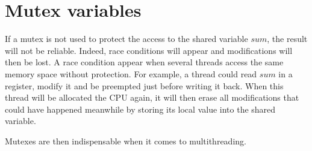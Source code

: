 \chapter{Mutex variables}

If a mutex is not used to protect the access to the shared variable $sum$, the result will not be reliable. Indeed, race conditions will appear and modifications will then be lost. A race condition appear when several threads access the same memory space without protection. For example, a thread could read $sum$ in a register, modify it and be preempted just before writing it back. When this thread will be allocated the CPU again, it will then erase all modifications that could have happened meanwhile by storing its local value into the shared variable.

Mutexes are then indispensable when it comes to multithreading.
